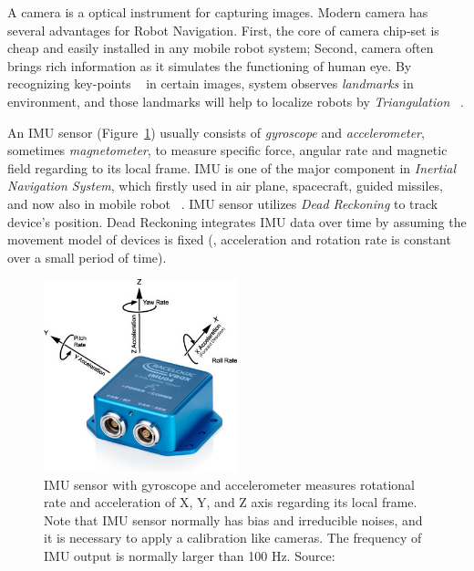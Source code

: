 A camera is a optical instrument for capturing images. Modern camera has several advantages for Robot Navigation. First, the core of camera chip-set is cheap and easily installed in any mobile robot system; Second, camera often brings rich information as it simulates the functioning of human eye. By recognizing key-points ~\cite{shi1994good, lowe1999object, rosten2010faster} in certain images, system observes \textit{landmarks} in environment, and those landmarks will help to localize robots by \textit{Triangulation} ~\cite{davison2003real, klein2007parallel, eade2007monocular}.

An IMU sensor (Figure~\ref{fig:fig1-1}) usually consists of \textit{gyroscope} and \textit{accelerometer}, sometimes \textit{magnetometer}, to measure specific force, angular rate and magnetic field regarding to its local frame. IMU is one of the major component in \textit{Inertial Navigation System}, which firstly used in air plane, spacecraft, guided missiles, and now also in mobile robot ~\cite{batalin2004mobile, lee2009position, mourikis2007multi, forster2015imu}. IMU sensor utilizes \textit{Dead Reckoning} to track device's position. Dead Reckoning integrates IMU data over time by assuming the movement model of devices is fixed (\ie, acceleration and rotation rate is constant over a small period of time). 

\begin{figure}
    \centering
    \includegraphics[width=0.5\textwidth]{CONTENT/Figure/Figure1-1_IMU_Sensor.jpg}
    \caption{IMU sensor with gyroscope and accelerometer measures rotational rate and acceleration of X, Y, and Z axis regarding its local frame. Note that IMU sensor normally has bias and irreducible noises, and it is necessary to apply a calibration like cameras. The frequency of IMU output is normally larger than 100 Hz. Source: \cite{Figure1-1_IMU_Sensor}}
    \label{fig:fig1-1}
\end{figure}


